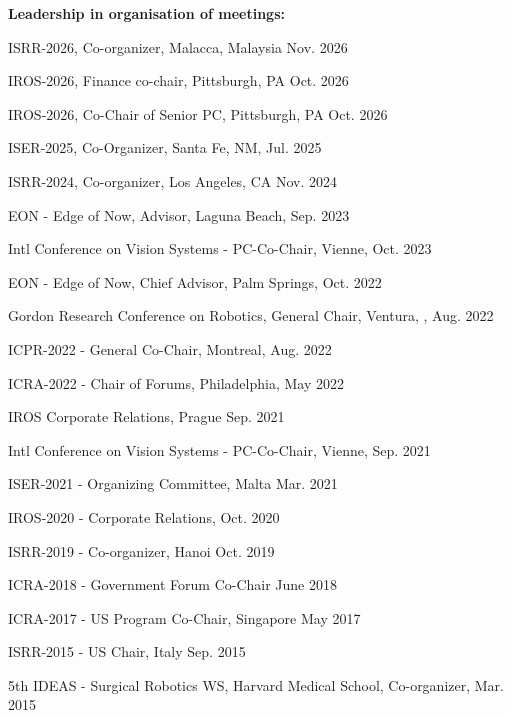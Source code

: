 \documentclass{article}
\begin{document}
\begin{cv}
	\begin{cvlist}{\bf Leadership in organisation of meetings:}
    \item ISRR-2026, Co-organizer, Malacca, Malaysia \cftdotfill{\cftdotsep} Nov. 2026
		\item IROS-2026, Finance co-chair, Pittsburgh, PA \cftdotfill{\cftdotsep} Oct. 2026
		\item IROS-2026, Co-Chair of Senior PC, Pittsburgh, PA \cftdotfill{\cftdotsep} Oct. 2026
		\item ISER-2025, Co-Organizer, Santa Fe, NM, \cftdotfill{\cftdotsep} Jul. 2025
		\item ISRR-2024, Co-organizer, Los Angeles, CA \cftdotfill{\cftdotsep}  Nov. 2024
		\item EON - Edge of Now, Advisor, Laguna Beach, \cftdotfill{\cftdotsep} Sep. 2023
		\item Intl Conference on Vision Systems - PC-Co-Chair, Vienne, \cftdotfill{\cftdotsep} Oct. 2023
		\item EON - Edge of Now, Chief Advisor, Palm Springs, \cftdotfill{\cftdotsep}	Oct. 2022
		\item Gordon Research Conference on Robotics, General Chair, Ventura,	\cftdotfill{\cftdotsep}, Aug. 2022
		\item ICPR-2022 - General Co-Chair, Montreal, \cftdotfill{\cftdotsep} Aug. 2022
		\item ICRA-2022 - Chair of Forums, Philadelphia, \cftdotfill{\cftdotsep} May 2022
		\item IROS Corporate Relations, Prague \cftdotfill{\cftdotsep} Sep. 2021
		\item Intl Conference on Vision Systems - PC-Co-Chair, Vienne,
		\cftdotfill{\cftdotsep} Sep. 2021
		\item ISER-2021 - Organizing Committee, Malta \cftdotfill{\cftdotsep} Mar. 2021
		\item IROS-2020 - Corporate Relations, \cftdotfill{\cftdotsep} Oct. 2020
		\item ISRR-2019 - Co-organizer, Hanoi \cftdotfill{\cftdotsep} Oct. 2019
		\item ICRA-2018 - Government Forum Co-Chair \cftdotfill{\cftdotsep} June 2018
		\item ICRA-2017 - US Program Co-Chair, Singapore \cftdotfill{\cftdotsep} May
		2017
		\item ISRR-2015 - US Chair, Italy \cftdotfill{\cftdotsep} Sep. 2015
		\item 5th IDEAS - Surgical Robotics WS, Harvard Medical School, Co-organizer,
		\cftdotfill{\cftdotsep} Mar. 2015

\end{cvlist}
\end{cv}
\end{document}
